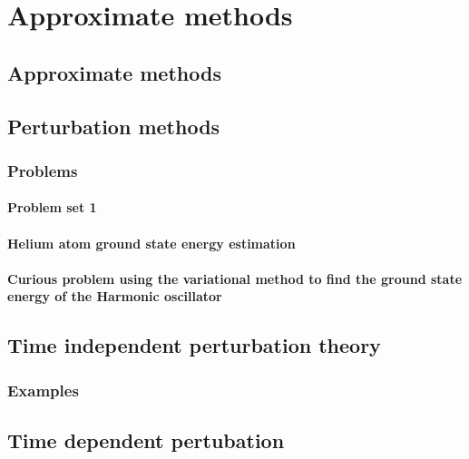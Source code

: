 %   
\part{Approximate methods}
   \chapter{Approximate methods}
      
   \chapter{Perturbation methods}
      
      \section{Problems}
         \subsection{Problem set 1}
            
         \subsection{Helium atom ground state energy estimation}
            
         \subsection{Curious problem using the variational method to find the ground state energy of the Harmonic oscillator}
            
   \chapter{Time independent perturbation theory}
      
      
      
      \section{Examples}
         
   \chapter{Time dependent pertubation}
      
      
      
      
      
